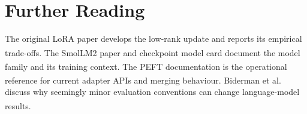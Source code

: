 
\section{Further Reading}

The original LoRA paper develops the low-rank update and reports its empirical
trade-offs.\textsuperscript{\cite{huLoRALowRank2021}}
The SmolLM2 paper and checkpoint model card document the model family and its
training
context.\textsuperscript{\cite{benallalSmolLM2WhenSmol2025,
huggingfaceSmolLM2135MInstruct2026}}
The PEFT documentation is the operational reference for current adapter APIs
and merging behaviour.\textsuperscript{\cite{huggingfacePEFTLoRA2026}}
Biderman et al. discuss why seemingly minor evaluation conventions can change
language-model
results.\textsuperscript{\cite{bidermanLessonsTrenchesReproducible2026}}
